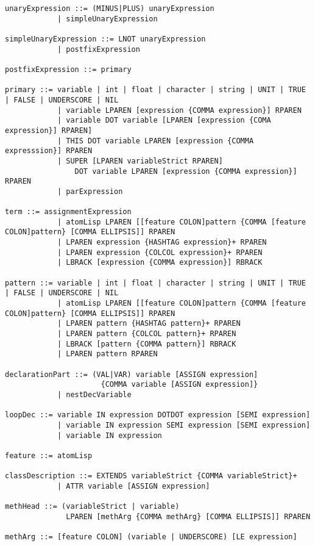 \begin{lstlisting}[label={lst:newOzEBNF},language=ebnf]
unaryExpression ::= (MINUS|PLUS) unaryExpression
            | simpleUnaryExpression

simpleUnaryExpression ::= LNOT unaryExpression
            | postfixExpression

postfixExpression ::= primary

primary ::= variable | int | float | character | string | UNIT | TRUE | FALSE | UNDERSCORE | NIL
            | variable LPAREN [expression {COMMA expression}] RPAREN
            | variable DOT variable [LPAREN [expression {COMA expression}] RPAREN]
            | THIS DOT variable LPAREN [expression {COMMA expresssion}] RPAREN
            | SUPER [LPAREN variableStrict RPAREN]
                DOT variable LPAREN [expression {COMMA expression}] RPAREN
            | parExpression

term ::= assignmentExpression
            | atomLisp LPAREN [[feature COLON]pattern {COMMA [feature COLON]pattern} [COMMA ELLIPSIS]] RPAREN
            | LPAREN expression {HASHTAG expression}+ RPAREN
            | LPAREN expression {COLCOL expression}+ RPAREN
            | LBRACK [expression {COMMA expression}] RBRACK

pattern ::= variable | int | float | character | string | UNIT | TRUE | FALSE | UNDERSCORE | NIL
            | atomLisp LPAREN [[feature COLON]pattern {COMMA [feature COLON]pattern} [COMMA ELLIPSIS]] RPAREN
            | LPAREN pattern {HASHTAG pattern}+ RPAREN
            | LPAREN pattern {COLCOL pattern}+ RPAREN
            | LBRACK [pattern {COMMA pattern}] RBRACK
            | LPAREN pattern RPAREN

declarationPart ::= (VAL|VAR) variable [ASSIGN expression]
                      {COMMA variable [ASSIGN expression]}
            | nestDecVariable

loopDec ::= variable IN expression DOTDOT expression [SEMI expression]
            | variable IN expression SEMI expression [SEMI expression]
            | variable IN expression

feature ::= atomLisp

classDescription ::= EXTENDS variableStrict {COMMA variableStrict}+
            | ATTR variable [ASSIGN expression]

methHead ::= (variableStrict | variable)
              LPAREN [methArg {COMMA methArg} [COMMA ELLIPSIS]] RPAREN

methArg ::= [feature COLON] (variable | UNDERSCORE) [LE expression]

\end{lstlisting}
